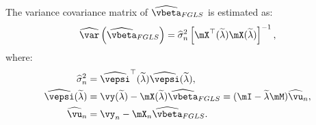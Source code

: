 \documentclass[english,12pt]{book}\usepackage[]{graphicx}\usepackage[]{xcolor}
\begin{document}
The variance covariance matrix of $\widehat{\vbeta}_{FGLS}$ is estimated as:
\begin{equation*}
  \widehat{\var}\left(\widehat{\vbeta}_{FGLS}\right) = \widehat{\sigma}^2_n\left[\mX^\top(\widetilde{\lambda})\mX(\widetilde{\lambda})\right]^{-1},
\end{equation*}
%
where:
\begin{equation*}
  \begin{aligned}
    \widehat{\sigma}^2_n & = \widehat{\vepsi}^\top(\widetilde{\lambda})\widehat{\vepsi}(\widetilde{\lambda}), \\
    \widehat{\vepsi}(\widetilde{\lambda}) & = \vy(\widetilde{\lambda}) - \mX(\widetilde{\lambda})\widehat{\vbeta}_{FGLS} = (\mI-\widetilde{\lambda}\mM)\widehat{\vu}_n, \\
    \widehat{\vu}_n & = \vy_n-\mX_n\widehat{\vbeta}_{FGLS}. 
  \end{aligned}
\end{equation*}
\end{document}
